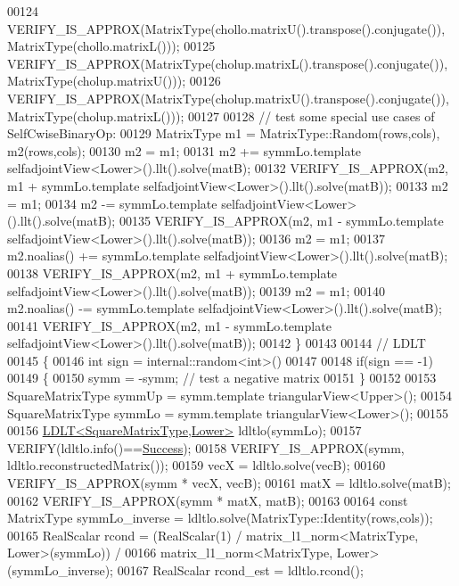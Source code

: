 \begin{DoxyCode}
00124     VERIFY\_IS\_APPROX(MatrixType(chollo.matrixU().transpose().conjugate()), MatrixType(chollo.matrixL()));
00125     VERIFY\_IS\_APPROX(MatrixType(cholup.matrixL().transpose().conjugate()), MatrixType(cholup.matrixU()));
00126     VERIFY\_IS\_APPROX(MatrixType(cholup.matrixU().transpose().conjugate()), MatrixType(cholup.matrixL()));
00127 
00128     \textcolor{comment}{// test some special use cases of SelfCwiseBinaryOp:}
00129     MatrixType m1 = MatrixType::Random(rows,cols), m2(rows,cols);
00130     m2 = m1;
00131     m2 += symmLo.template selfadjointView<Lower>().llt().solve(matB);
00132     VERIFY\_IS\_APPROX(m2, m1 + symmLo.template selfadjointView<Lower>().llt().solve(matB));
00133     m2 = m1;
00134     m2 -= symmLo.template selfadjointView<Lower>().llt().solve(matB);
00135     VERIFY\_IS\_APPROX(m2, m1 - symmLo.template selfadjointView<Lower>().llt().solve(matB));
00136     m2 = m1;
00137     m2.noalias() += symmLo.template selfadjointView<Lower>().llt().solve(matB);
00138     VERIFY\_IS\_APPROX(m2, m1 + symmLo.template selfadjointView<Lower>().llt().solve(matB));
00139     m2 = m1;
00140     m2.noalias() -= symmLo.template selfadjointView<Lower>().llt().solve(matB);
00141     VERIFY\_IS\_APPROX(m2, m1 - symmLo.template selfadjointView<Lower>().llt().solve(matB));
00142   \}
00143 
00144   \textcolor{comment}{// LDLT}
00145   \{
00146     \textcolor{keywordtype}{int} sign = internal::random<int>()%
00147 
00148     \textcolor{keywordflow}{if}(sign == -1)
00149     \{
00150       symm = -symm; \textcolor{comment}{// test a negative matrix}
00151     \}
00152 
00153     SquareMatrixType symmUp = symm.template triangularView<Upper>();
00154     SquareMatrixType symmLo = symm.template triangularView<Lower>();
00155 
00156     \hyperlink{group___cholesky___module_class_eigen_1_1_l_d_l_t}{LDLT<SquareMatrixType,Lower>} ldltlo(symmLo);
00157     VERIFY(ldltlo.info()==\hyperlink{group__enums_gga85fad7b87587764e5cf6b513a9e0ee5ea52581b035f4b59c203b8ff999ef5fcea}{Success});
00158     VERIFY\_IS\_APPROX(symm, ldltlo.reconstructedMatrix());
00159     vecX = ldltlo.solve(vecB);
00160     VERIFY\_IS\_APPROX(symm * vecX, vecB);
00161     matX = ldltlo.solve(matB);
00162     VERIFY\_IS\_APPROX(symm * matX, matB);
00163 
00164     \textcolor{keyword}{const} MatrixType symmLo\_inverse = ldltlo.solve(MatrixType::Identity(rows,cols));
00165     RealScalar rcond = (RealScalar(1) / matrix\_l1\_norm<MatrixType, Lower>(symmLo)) /
00166                              matrix\_l1\_norm<MatrixType, Lower>(symmLo\_inverse);
00167     RealScalar rcond\_est = ldltlo.rcond();

\end{DoxyCode}
